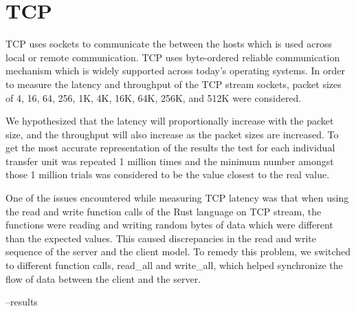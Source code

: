 \section{TCP}
TCP uses sockets to communicate the between the hosts which is used across local or remote communication. TCP uses byte-ordered reliable communication mechanism which is widely supported across today's operating systems. In order to measure the latency and throughput of the TCP stream sockets, packet sizes of 4, 16, 64, 256, 1K, 4K, 16K, 64K, 256K, and 512K were considered.

We hypothesized that the latency will proportionally increase with the packet size, and the throughput will also increase as the packet sizes are increased. To get the most accurate representation of the results the test for each individual transfer unit was repeated 1 million times and the minimum number amongst those 1 million trials was considered to be the value closest to the real value.

One of the issues encountered while measuring TCP latency was that when using the read and write function calls of the Rust language on TCP stream, the functions were reading and writing random bytes of data which were different than the expected values. This caused discrepancies in the read and write sequence of the server and the client model. To remedy this problem, we switched to different function calls, read_all and write_all, which helped synchronize the flow of data between the client and the server.

--results


